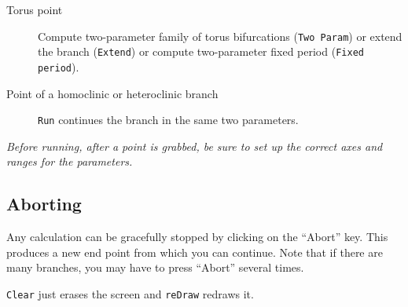 \documentclass{article}
\begin{document}
\begin{description}
\item[Torus point]  Compute two-parameter family of torus
bifurcations ({\tt Two Param}) or extend the branch ({\tt Extend}) or compute two-parameter
fixed period ({\tt Fixed period}).

\item[Point of a homoclinic or heteroclinic branch] {\tt Run} continues the
branch in the same two parameters.
\end{description}

{\em Before running, after a point is grabbed, be sure to set up the
correct axes and ranges for the parameters.}

\subsection{Aborting}
Any calculation can be gracefully stopped by clicking on the ``Abort''
key. This produces a new end point from which you can continue.  Note
that if there are many branches, you may have to press ``Abort''
several times.

{\tt Clear} just erases the screen and {\tt reDraw} redraws it.
\end{document}
